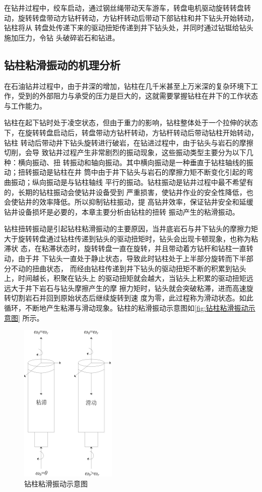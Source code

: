 \documentclass[12pt,hyperref,a4paper,UTF8]{ctexart}
\begin{document}
	在钻井过程中，绞车启动，通过钢丝绳带动天车游车，转盘电机驱动旋转转盘转动，旋转转盘带动方钻杆转动，方钻杆转动后带动下部钻柱和井下钻头开始转动，钻柱将从 转盘处传递下来的驱动扭矩传递到井下钻头处，并同时通过钻铤给钻头施加压力，令钻 头破碎岩石和钻进。
	
	
	\subsection{钻柱粘滑振动的机理分析}
	在石油钻井过程中，由于井深的增加，钻柱在几千米甚至上万米深的复杂环境下工作，受到的外部阻力与承受的压力是巨大的，这就需要掌握钻柱在井下的工作状态与工作能力。
	
	钻柱在起下钻时处于凌空状态，但由于重力的影响，钻柱整体处于一个拉伸的状态 下，在旋转转盘启动后，转盘带动方钻杆转动，方钻杆转动后带动钻柱开始转动，钻柱 转动后带动井下钻头旋转进行破岩，在钻进过程中，由于钻头与岩石的摩擦切削，会导 致钻井过程产生非常剧烈的振动现象，这些振动类型主要分为以下几种：横向振动、扭 转振动和轴向振动。其中横向振动是一种垂直于钻柱轴线的振动；扭转振动是钻柱在井 筒中由于井下钻头与岩石的摩擦力矩不断变化引起的弯曲振动；纵向振动是与钻柱轴线 平行的振动。钻柱振动是钻井过程中最不希望有的，长期的钻柱振动会使钻井设备受到 严重损害，使钻井作业的安全性降低，也会使钻井的效率降低。所以抑制钻柱振动，提 高钻井效率，保证钻井安全和延缓钻井设备损坏是必要的，本章主要分析由钻柱的扭转 振动产生的粘滑振动。
	
	钻柱扭转振动是引起钻柱粘滑振动的主要原因，当井底岩石与井下钻头的摩擦力矩 大于旋转转盘通过钻柱传递到钻头的驱动扭矩时，钻头会出现卡顿现象，也称为粘滞状 态，在粘滞状态时，旋转转盘一直在旋转，并且带动着方钻杆和钻柱一直转动，由于井 下钻头一直处于静止状态，导致此时钻柱处于上半部分旋转而下半部分不动的扭曲状态， 而经由钻柱传递到井下钻头的驱动扭矩不断的积累到钻头上，时间越长，积聚在钻头上 的驱动扭矩就会越大，当钻头上积累的驱动扭矩远远大于井下岩石与钻头摩擦产生的摩 擦力矩时，钻头就会突破粘滞，进而高速旋转切割岩石并回到原始状态后继续旋转到速 度为零，此过程称为滑动状态。如此循环，不断地产生粘滞与滑动现象。钻柱的粘滑振动示意图如\autoref{fig:钻柱粘滑振动示意图} 所示。
	
	\begin{figure}[!htbp]
		\centering
		\includegraphics[width=0.35\linewidth]{figures/钻柱粘滑振动示意图}
		\caption{钻柱粘滑振动示意图}
		\label{fig:钻柱粘滑振动示意图}
	\end{figure}
	
\end{document}
